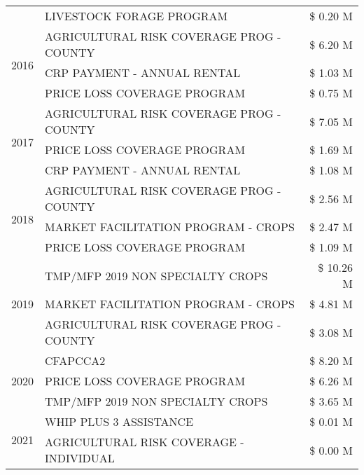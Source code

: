 \begin{tabular}{llr}
 & LIVESTOCK FORAGE PROGRAM & \$ 0.20 M \\
\cline{1-3}
\multirow[t]{3}{*}{2016} & AGRICULTURAL RISK COVERAGE PROG - COUNTY & \$ 6.20 M \\
 & CRP PAYMENT - ANNUAL RENTAL & \$ 1.03 M \\
 & PRICE LOSS COVERAGE PROGRAM & \$ 0.75 M \\
\cline{1-3}
\multirow[t]{3}{*}{2017} & AGRICULTURAL RISK COVERAGE PROG - COUNTY & \$ 7.05 M \\
 & PRICE LOSS COVERAGE PROGRAM & \$ 1.69 M \\
 & CRP PAYMENT - ANNUAL RENTAL & \$ 1.08 M \\
\cline{1-3}
\multirow[t]{3}{*}{2018} & AGRICULTURAL RISK COVERAGE PROG - COUNTY & \$ 2.56 M \\
 & MARKET FACILITATION PROGRAM - CROPS & \$ 2.47 M \\
 & PRICE LOSS COVERAGE PROGRAM & \$ 1.09 M \\
\cline{1-3}
\multirow[t]{3}{*}{2019} & TMP/MFP 2019 NON SPECIALTY CROPS & \$ 10.26 M \\
 & MARKET FACILITATION PROGRAM - CROPS & \$ 4.81 M \\
 & AGRICULTURAL RISK COVERAGE PROG - COUNTY & \$ 3.08 M \\
\cline{1-3}
\multirow[t]{3}{*}{2020} & CFAPCCA2 & \$ 8.20 M \\
 & PRICE LOSS COVERAGE PROGRAM & \$ 6.26 M \\
 & TMP/MFP 2019 NON SPECIALTY CROPS & \$ 3.65 M \\
\cline{1-3}
\multirow[t]{2}{*}{2021} & WHIP PLUS 3 ASSISTANCE & \$ 0.01 M \\
 & AGRICULTURAL RISK COVERAGE - INDIVIDUAL & \$ 0.00 M \\
\cline{1-3}
\bottomrule
\end{tabular}
